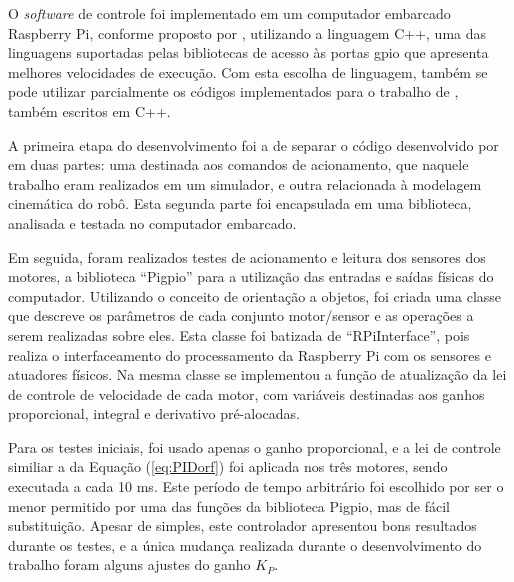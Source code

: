 O \textit{software} de controle foi implementado em um computador embarcado Raspberry Pi, conforme proposto por \citet{ritter2016modelagem}, utilizando a linguagem C++, uma das linguagens suportadas pelas bibliotecas de acesso às portas \acrlong{gpio} que apresenta melhores velocidades de execução. Com esta escolha de linguagem, também se pode utilizar parcialmente os códigos implementados para o trabalho de \citet{ritter2016modelagem}, também escritos em C++.




A primeira etapa do desenvolvimento foi a de separar o código desenvolvido por \citet{ritter2016modelagem} em duas partes: uma destinada aos comandos de acionamento, que naquele trabalho eram realizados em um s\acrshort{imu}lador, e outra relacionada à modelagem cinemática do robô. Esta segunda parte foi encapsulada em uma biblioteca, analisada e testada no computador embarcado.

Em seguida, foram realizados testes de acionamento e leitura dos sensores dos motores, a biblioteca ``Pi\acrshort{gpio}'' \citep{pigpio} para a utilização das entradas e saídas físicas do computador. Utilizando o conceito de orientação a objetos, foi criada uma classe que descreve os parâmetros de cada conjunto motor/sensor e as operações a serem realizadas sobre eles. Esta classe foi batizada de ``RPiInterface'', pois realiza o interfaceamento do processamento da Raspberry Pi com os sensores e atuadores físicos.
Na mesma classe se implementou a função de atualização da lei de controle de velocidade de cada motor, com variáveis destinadas aos ganhos proporcional, integral e derivativo pré-alocadas.

Para os testes iniciais, foi usado apenas o ganho proporcional, e a lei de controle similiar a da Equação (\ref{eq:PIDorf}) foi aplicada nos três motores, sendo executada a cada 10 ms. Este período de tempo arbitrário foi escolhido por ser o menor permitido por uma das funções da biblioteca Pi\acrshort{gpio}, mas de fácil substituição. Apesar de simples, este controlador apresentou bons resultados durante os testes, e a única mudança realizada durante o desenvolvimento do trabalho foram alguns ajustes do ganho $K_P$.

